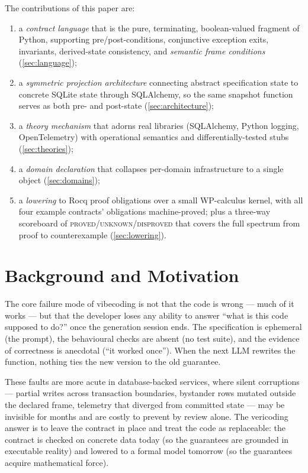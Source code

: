 \documentclass[11pt,a4paper]{article}
\begin{document}
The contributions of this paper are:

\begin{enumerate}[label=(\roman*)]
\item a \emph{contract language} that is the pure, terminating,
  boolean-valued fragment of Python, supporting pre/post-conditions,
  conjunctive exception exits, invariants, derived-state consistency,
  and \emph{semantic frame conditions} (\cref{sec:language});
\item a \emph{symmetric projection architecture} connecting abstract
  specification state to concrete SQLite state through SQLAlchemy, so
  the same snapshot function serves as both pre- and post-state
  (\cref{sec:architecture});
\item a \emph{theory mechanism} that adorns real libraries (SQLAlchemy,
  Python logging, OpenTelemetry) with operational semantics and
  differentially-tested stubs (\cref{sec:theories});
\item a \emph{domain declaration} that collapses per-domain
  infrastructure to a single object (\cref{sec:domains});
\item a \emph{lowering} to Rocq proof obligations over a small
  WP-calculus kernel, with all four example contracts' obligations
  machine-proved; plus a three-way scoreboard of
  \textsc{proved}/\textsc{unknown}/\textsc{disproved} that covers the
  full spectrum from proof to counterexample (\cref{sec:lowering}).
\end{enumerate}

\section{Background and Motivation}\label{sec:background}

The core failure mode of vibecoding is not that the code is wrong ---
much of it works --- but that the developer loses any ability to
answer ``what is this code supposed to do?'' once the generation
session ends.  The specification is ephemeral (the prompt), the
behavioural checks are absent (no test suite), and the evidence of
correctness is anecdotal (``it worked once'').  When the next LLM
rewrites the function, nothing ties the new version to the old
guarantee.

These faults are more acute in database-backed services, where
silent corruptions --- partial writes across transaction boundaries,
bystander rows mutated outside the declared frame, telemetry that
diverged from committed state --- may be invisible for months and are
costly to prevent by review alone.  The vericoding answer is to leave
the contract in place and treat the code as replaceable: the contract
is checked on concrete data today (so the guarantees are grounded in
executable reality) and lowered to a formal model tomorrow (so the
guarantees acquire mathematical force).
\end{document}
